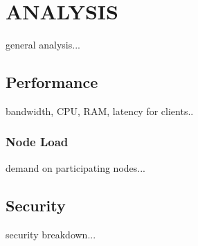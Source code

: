 

\chapter{\uppercase{Analysis}}

general analysis...

\section{Performance}

bandwidth, CPU, RAM, latency for clients..

\subsection{Node Load}

demand on participating nodes...

\section{Security}

security breakdown...